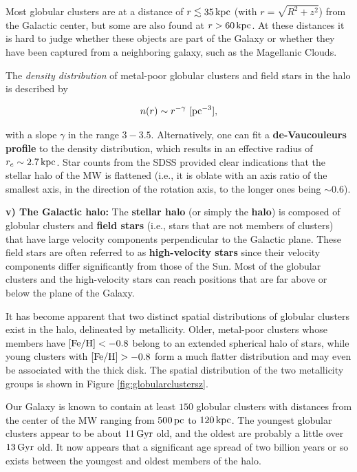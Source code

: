 \documentclass[a4paper,10pt]{article}
\begin{document}
{\noindent}Most globular clusters are at a distance of $r\lesssim35\,{\rm kpc}$ (with $r=\sqrt{R^2+z^2}$) from the Galactic center, but some are also found at $r>60\,{\rm kpc}$. At these distances it is hard to judge whether these objects are part of the Galaxy or whether they have been captured from a neighboring galaxy, such as the Magellanic Clouds.

{\noindent}The \textit{density distribution} of metal-poor globular clusters and field stars in the halo is described by

\begin{align*}
    n(r) \sim r^{-\gamma} ~ [{\rm pc^{-3}}],
\end{align*}

{\noindent}with a slope $\gamma$ in the range $3-3.5$. Alternatively, one can fit a \textbf{de-Vaucouleurs profile} to the density distribution, which results in an effective radius of $r_e\sim2.7\,{\rm kpc}$. Star counts from the SDSS provided clear indications that the stellar halo of the MW is flattened (i.e., it is oblate with an axis ratio of the smallest axis, in the direction of the rotation axis, to the longer ones being $\sim0.6$).

{\noindent}\textbf{v) The Galactic halo:} The \textbf{stellar halo} (or simply the \textbf{halo}) is composed of globular clusters and \textbf{field stars} (i.e., stars that are not members of clusters) that have large velocity components perpendicular to the Galactic plane. These field stars are often referred to as \textbf{high-velocity stars} since their velocity components differ significantly from those of the Sun. Most of the globular clusters and the high-velocity stars can reach positions that are far above or below the plane of the Galaxy. 

{\noindent}It has become apparent that two distinct spatial distributions of globular clusters exist in the halo, delineated by metallicity. Older, metal-poor clusters whose members have $[{\rm Fe/H}]<-0.8$ belong to an extended spherical halo of stars, while young clusters with $[{\rm Fe/H}]>-0.8$ form a much flatter distribution and may even be associated with the thick disk. The spatial distribution of the two metallicity groups is shown in Figure \ref{fig:globularclustersz}.

{\noindent}Our Galaxy is known to contain at least $150$ globular clusters with distances from the center of the MW ranging from $500\,{\rm pc}$ to $120\,{\rm kpc}$. The youngest globular clusters appear to be about $11\,{\rm Gyr}$ old, and the oldest are probably a little over $13\,{\rm Gyr}$ old. It now appears that a significant age spread of two billion years or so exists between the youngest and oldest members of the halo.
\end{document}
